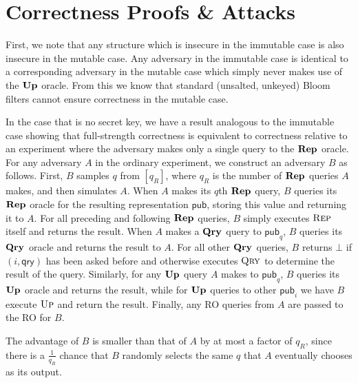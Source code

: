 \section{Correctness Proofs \& Attacks}

First, we note that any structure which is insecure in the immutable case is also insecure in the mutable case. Any adversary in the immutable case is identical to a corresponding adversary in the mutable case which simply never makes use of the $\mathbf{Up}\hspace{0.5pt}$ oracle. From this we know that standard (unsalted, unkeyed) Bloom filters cannot ensure correctness in the mutable case.

In the case that is no secret key, we have a result analogous to the immutable case showing that full-strength correctness is equivalent to correctness relative to an experiment where the adversary makes only a single query to the $\mathbf{Rep}\hspace{0.5pt}$ oracle.  For any adversary $A$ in the ordinary experiment, we construct an adversary $B$ as follows. First, $B$ samples $q$ from $[q_R]$, where $q_R$ is the number of $\mathbf{Rep}\hspace{0.5pt}$ queries $A$ makes, and then simulates $A$. When $A$ makes its $q$th $\mathbf{Rep}\hspace{0.5pt}$ query, $B$ queries its $\mathbf{Rep}\hspace{0.5pt}$ oracle for the resulting representation $\mathsf{pub}$, storing this value and returning it to $A$. For all preceding and following $\mathbf{Rep}\hspace{0.5pt}$ queries, $B$ simply executes $\textsc{Rep}$ itself and returns the result. When $A$ makes a $\mathbf{Qry}\hspace{0.5pt}$ query to $\mathsf{pub}_q$, $B$ queries its $\mathbf{Qry}\hspace{0.5pt}$ oracle and returns the result to $A$. For all other $\mathbf{Qry}\hspace{0.5pt}$ queries, $B$ returns $\bot$ if $(i,\mathsf{qry})$ has been asked before and otherwise executes $\textsc{Qry}$ to determine the result of the query. Similarly, for any $\mathbf{Up}\hspace{0.5pt}$ query $A$ makes to $\mathsf{pub}_q$, $B$ queries its $\mathbf{Up}\hspace{0.5pt}$ oracle and returns the result, while for $\mathbf{Up}\hspace{0.5pt}$ queries to other $\mathsf{pub}_i$ we have $B$ execute $\textsc{Up}$ and return the result. Finally, any RO queries from $A$ are passed to the RO for $B$.

The advantage of $B$ is smaller than that of $A$ by at most a factor of $q_R$, since there is a $\frac{1}{q_R}$ chance that $B$ randomly selects the same $q$ that $A$ eventually chooses as its output.

